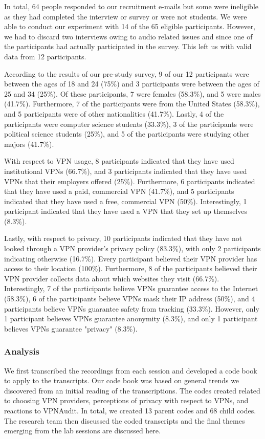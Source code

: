 In total, 64 people responded to our recruitment e-mails but some were ineligible as they had completed the interview or survey or were not students.
We were able to conduct our experiment with 14 of the 65 eligible participants.
However, we had to discard two interviews owing to audio related issues and since one of the participants had actually participated in the survey.
This left us with valid data from 12 participants.

According to the results of our pre-study survey, 9 of our 12 participants were between the ages of 18 and 24 (75\%) and 3 participants were between the ages of 25 and 34 (25\%).
Of these participants, 7 were females (58.3\%), and 5 were males (41.7\%).
Furthermore, 7 of the participants were from the United States (58.3\%), and 5 participants were of other nationalities (41.7\%). 
Lastly, 4 of the participants were computer science students (33.3\%), 3 of the participants were political science students (25\%), and 5 of the participants were studying other majors (41.7\%).

With respect to VPN usage, 8 participants indicated that they have used institutional VPNs (66.7\%), and 3 participants indicated that they have used VPNs that their employers offered (25\%).
Furthermore, 6 participants indicated that they have used a paid, commercial VPN (41.7\%), and 5 participants indicated that they have used a free, commercial VPN (50\%).
Interestingly, 1 participant indicated that they have used a VPN that they set up themselves (8.3\%).

Lastly, with respect to privacy, 10 participants indicated that they have not looked through a VPN provider's privacy policy (83.3\%), with only 2 participants indicating otherwise (16.7\%).
Every participant believed their VPN provider has access to their location (100\%).
Furthermore, 8 of the participants believed their VPN provider collects data about which websites they visit (66.7\%).
Interestingly, 7 of the participants believe VPNs guarantee access to the Internet (58.3\%), 6 of the participants believe VPNs mask their IP address (50\%), and 4 participants believe VPNs guarantee safety from tracking (33.3\%).
However, only 1 participant believes VPNs guarantee anonymity (8.3\%), and only 1 participant believes VPNs guarantee "privacy" (8.3\%).

\subsubsection{Analysis}
We first transcribed the recordings from each session and developed a code book to apply to the transcripts.
Our code book was based on general trends we discovered from an initial reading of the transcriptions.
The codes created related to choosing VPN providers, perceptions of privacy with respect to VPNs, and reactions to VPNAudit.
In total, we created 13 parent codes and 68 child codes.  The research team then discussed the coded transcripts and the final themes emerging from the lab sessions are discussed here.

